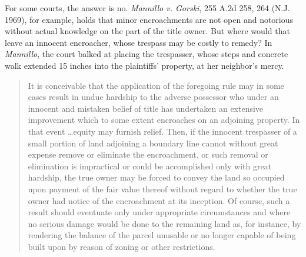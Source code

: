 For some courts, the answer is no. \textit{Mannillo v. Gorski}, 255
A.2d 258, 264 (N.J. 1969), for example, holds that minor encroachments are not
open and notorious without actual knowledge on the part of the title owner. But
where would that leave an innocent encroacher, whose trespass may be costly to
remedy? In \textit{Mannillo}, the court balked at placing the trespasser, whose
steps and concrete walk extended 15 inches into the plaintiffs' property, at
her neighbor's mercy.
\begin{quote}
It is conceivable that the application of the foregoing rule may in some cases
result in undue hardship to the adverse possessor who under an innocent and
mistaken belief of title has undertaken an extensive improvement which to some
extent encroaches on an adjoining property. In that event \ldots equity may
furnish relief. Then, if the innocent trespasser of a small portion of land
adjoining a boundary line cannot without great expense remove or eliminate the
encroachment, or such removal or elimination is impractical or could be
accomplished only with great hardship, the true owner may be forced to convey
the land so occupied upon payment of the fair value thereof without regard to
whether the true owner had notice of the encroachment at its inception. Of
course, such a result should eventuate only under appropriate circumstances and
where no serious damage would be done to the remaining land as, for instance,
by rendering the balance of the parcel unusable or no longer capable of being
built upon by reason of zoning or other restrictions.
\end{quote}
